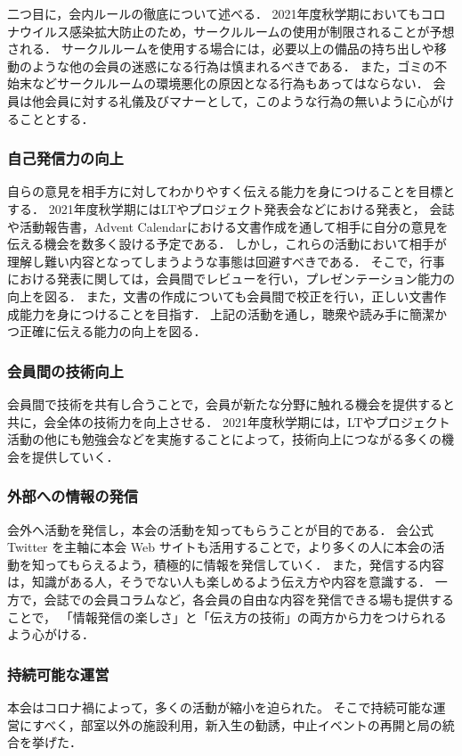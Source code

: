     二つ目に，会内ルールの徹底について述べる．
    2021年度秋学期においてもコロナウイルス感染拡大防止のため，サークルルームの使用が制限されることが予想される．
    サークルルームを使用する場合には，必要以上の備品の持ち出しや移動のような他の会員の迷惑になる行為は慎まれるべきである．
    また，ゴミの不始末などサークルルームの環境悪化の原因となる行為もあってはならない．
    会員は他会員に対する礼儀及びマナーとして，このような行為の無いように心がけることとする．

\subsubsection*{自己発信力の向上}
    自らの意見を相手方に対してわかりやすく伝える能力を身につけることを目標とする．
    2021年度秋学期にはLTやプロジェクト発表会などにおける発表と，
    会誌や活動報告書，Advent Calendarにおける文書作成を通して相手に自分の意見を伝える機会を数多く設ける予定である．
    しかし，これらの活動において相手が理解し難い内容となってしまうような事態は回避すべきである．
    そこで，行事における発表に関しては，会員間でレビューを行い，プレゼンテーション能力の向上を図る．
    また，文書の作成についても会員間で校正を行い，正しい文書作成能力を身につけることを目指す．
    上記の活動を通し，聴衆や読み手に簡潔かつ正確に伝える能力の向上を図る．

\subsubsection*{会員間の技術向上}
    会員間で技術を共有し合うことで，会員が新たな分野に触れる機会を提供すると共に，会全体の技術力を向上させる．
    2021年度秋学期には，LTやプロジェクト活動の他にも勉強会などを実施することによって，技術向上につながる多くの機会を提供していく．

\subsubsection*{外部への情報の発信}
    会外へ活動を発信し，本会の活動を知ってもらうことが目的である．
    会公式 Twitter を主軸に本会 Web サイトも活用することで，より多くの人に本会の活動を知ってもらえるよう，積極的に情報を発信していく．
    また，発信する内容は，知識がある人，そうでない人も楽しめるよう伝え方や内容を意識する．
    一方で，会誌での会員コラムなど，各会員の自由な内容を発信できる場も提供することで，
    「情報発信の楽しさ」と「伝え方の技術」の両方から力をつけられるよう心がける．
    
\subsubsection*{持続可能な運営}
    本会はコロナ禍によって，多くの活動が縮小を迫られた。
    そこで持続可能な運営にすべく，部室以外の施設利用，新入生の勧誘，中止イベントの再開と局の統合を挙げた．
    
